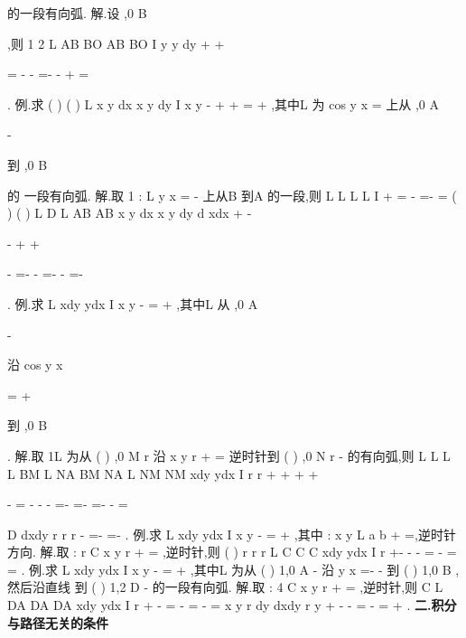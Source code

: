 的一段有向弧. 
解.设
,0
B \pi 






,则
1 2
L AB BO
AB
BO
I
y
y
dy
\pi 
\pi 
+
+


=
-
-
=-
-
+
=




\int 
\int 
\int 
\int 
\nabla 
. 
\textcolor{lyred}{例}.求
(
)
(
)
L
x
y dx
x
y dy
I
x
y
-
+
+
=
+
\int 
,其中L 为
cos
y
x
=
上从
,0
A
\pi 


-




到
,0
B \pi 






的 
一段有向弧. 
解.取
1 :
L
y
x
\pi 
=
-
上从B 到A 的一段,则
L L
L
L
I
+
=
-
=-
=
\int 
\int 
\int 
\nabla 
(
)
(
)
L
D
L
AB
AB
x
y dx
x
y dy
d
xdx
\pi 
\pi 
\sigma 
\pi 
\pi 
\pi 
\pi 
+
-




-
+
+


-
=-
-
=-
-
=-












\int 
\int 
\int 
\int \int 
\int 
\nabla 
. 
\textcolor{lyred}{例}.求
L
xdy
ydx
I
x
y
-
=
+
\int 
,其中L 从
,0
A
\pi 


-




沿
cos
y
x
\pi 


=
+




到
,0
B \pi 






. 
解.取
1L 为从
(
)
,0
M r
沿
x
y
r
+
=
逆时针到
(
)
,0
N
r
-
的有向弧,则 
L
L
L
L BM
L
NA
BM
NA
L
NM
NM
xdy
ydx
I
r
r
+
+
+
+


-
=
-
-
-
=-
=-
=-
-
=






\int 
\int 
\int 
\int 
\int 
\int 
\int 
\int 
\nabla 
\nabla 
D
dxdy
r
r
r
\pi 
\pi 
-
=-
\cdots 
=-
\int \int 
. 
\textcolor{lyred}{例}.求
L
xdy
ydx
I
x
y
-
=
+
\int \nabla 
,其中
:
x
y
L a
b
+
=,逆时针方向. 
解.取
:
r
C
x
y
r
+
=
,逆时针,则
(
)
r
r
r
L
C
C
C
xdy
ydx
I
r
\pi 
+-
-
-
=
-
=
=
\int 
\int 
\int 
\nabla 
\nabla 
\nabla 
. 
\textcolor{lyred}{例}.求
L
xdy
ydx
I
x
y
-
=
+
\int 
,其中L 为从
(
)
1,0
A -
沿
y
x
=-
-
到
(
)
1,0
B
,然后沿直线 
到
(
)
1,2
D -
的一段有向弧. 
解.取
: 4
C
x
y
r
+
=
,逆时针,则
C
L DA
DA
DA
xdy
ydx
I
r
+
-
=
-
=
-
=
\int 
\int 
\int 
\int 
\nabla 
\nabla 
x
y
r
dy
dxdy
r
y
\pi 
\pi 
\pi 
+
\le 
-
-
=
-
=
+
\int \int 
\int 
. 
\vspace{4pt}
{\bfseries \textcolor{lyred}{二.积分与路径无关的条件}}

